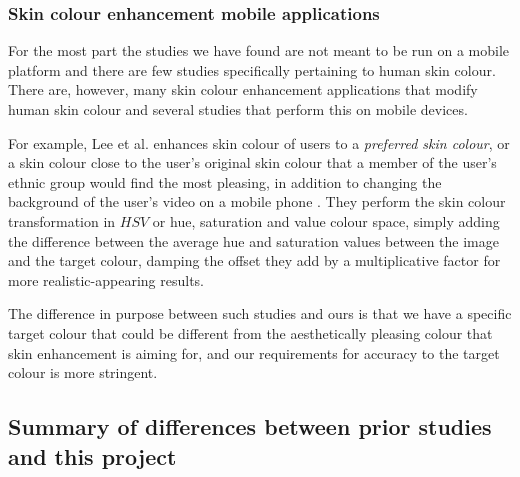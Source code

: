 \subsubsection{Skin colour enhancement mobile applications}
For the most part the studies we have found are not meant to be run on a mobile platform and there are few studies specifically pertaining to human skin colour. There are, however, many skin colour enhancement applications that modify human skin colour and several studies that perform this on mobile devices.

For example, Lee et al. enhances skin colour of users to a \textit{preferred skin colour}, or a skin colour close to the user's original skin colour that a member of the user's ethnic group would find the most pleasing, in addition to changing the background of the user's video on a mobile phone \cite{lee_2010_mobile}. They perform the skin colour transformation in $HSV$ or hue, saturation and value colour space, simply adding the difference between the average hue and saturation values between the image and the target colour, damping the offset they add by a multiplicative factor for more realistic-appearing results. 

The difference in purpose between such studies and ours is that we have a specific target colour that could be different from the aesthetically pleasing colour that skin enhancement is aiming for, and our requirements for accuracy to the target colour is more stringent.

\subsection{Summary of differences between prior studies and this project}


